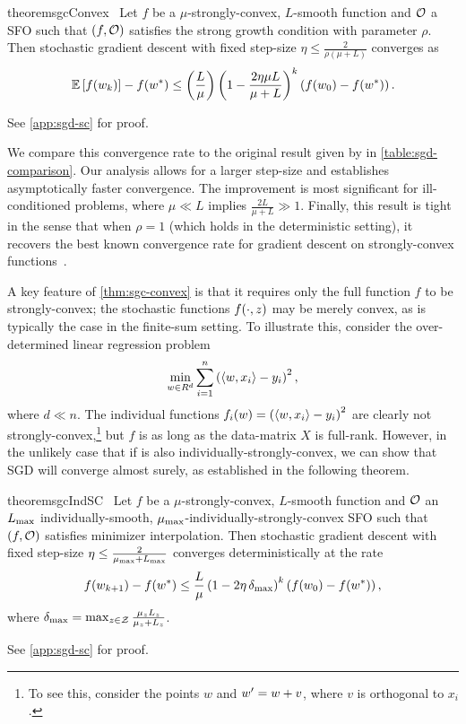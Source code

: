 \begin{restatable}{theorem}{sgcConvex}~\label{thm:sgc-convex}
    Let \( f \) be a \( \mu \)-strongly-convex, \( L \)-smooth function and \( \oracle{} \) a \ac{SFO} such that \( \rbr{f, \oracle{}} \) satisfies the strong growth condition with parameter \( \rho \).
    Then stochastic gradient descent with fixed step-size \( \eta \leq \frac{2}{\rho(\mu + L)} \) converges as 
    \[ \E\sbr{f(\wk)} - f(\wopt) \leq \rbr{\frac{L}{\mu}}\rbr{1 - \frac{2\eta \mu L}{\mu + L}}^k \rbr{f(\w_0) - f(\wopt)}. \] 
\end{restatable}%
\noindent See \autoref{app:sgd-sc} for proof.\hfill \break

We compare this convergence rate to the original result given by \citet[Theorem 5]{vaswani2019fast} in \autoref{table:sgd-comparison}.
Our analysis allows for a larger step-size and establishes asymptotically faster convergence.
The improvement is most significant for ill-conditioned problems, where \( \mu \ll L \) implies \( \frac{2 L}{\mu + L} \gg 1 \). 
Finally, this result is tight in the sense that when \( \rho = 1 \) (which holds in the deterministic setting), it recovers the best known convergence rate for gradient descent on strongly-convex functions~\citep[Theorem 3.12]{bubeck2015convex}.

A key feature of \autoref{thm:sgc-convex} is that it requires only the full function \( f \) to be strongly-convex; the stochastic functions \( f(\cdot, \z) \) may be merely convex, as is typically the case in the finite-sum setting.
To illustrate this, consider the over-determined linear regression problem
\[ \min_{\w \in R^d} \sum_{i=1}^n \rbr{\abr{\w, x_i} - y_i}^2, \]
where \( d \ll n \).
The individual functions \( f_i(\w) = \rbr{\abr{\w, x_i} - y_i}^2 \) are clearly not strongly-convex,\footnote{To see this, consider the points \(w\) and \( \w' = \w + v \), where \( v \) is orthogonal to \( x_i \).} but \( f \) is as long as the data-matrix \( X \) is full-rank. 
However, in the unlikely case that if \oracle{} is also individually-strongly-convex, we can show that \ac{SGD} will converge almost surely, as established in the following theorem.

\begin{restatable}{theorem}{sgcIndSC}~\label{thm:sgc-ind-sc}
    Let \( f \) be a \( \mu \)-strongly-convex, \( L \)-smooth function and \( \oracle{} \) an \( \Lmax \) individually-smooth, \( \mumax \)-individually-strongly-convex \ac{SFO} such that \( \rbr{f, \oracle{}} \) satisfies minimizer interpolation. 
    Then stochastic gradient descent with fixed step-size \( \eta \leq \frac{2}{\mumax + \Lmax} \) converges deterministically at the rate 
    \[ f(\wkk) - f(\wopt) \leq \frac{L}{\mu} \rbr{1 - 2 \eta \, \delta_{\text{max}} }^k \rbr{f(\w_0) - f(\wopt)}, \] 
    where \( \delta_{\text{max}} = \max_{\z \in \calZ} \frac{\mu_\z L_\z}{\mu_\z + L_\z} \).
\end{restatable}%
\noindent See \autoref{app:sgd-sc} for proof.\hfill \break

